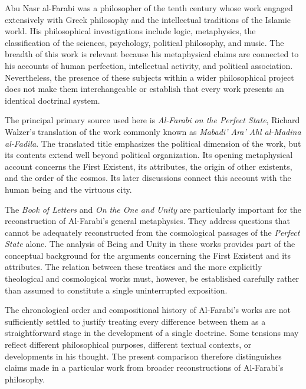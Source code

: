 Abu Nasr al-Farabi was a philosopher of the tenth
century whose work engaged extensively with Greek
philosophy and the intellectual traditions of the
Islamic world. His philosophical investigations
include logic, metaphysics, the classification of
the sciences, psychology, political philosophy,
and music. The breadth of this work is relevant
because his metaphysical claims are connected to
his accounts of human perfection, intellectual
activity, and political association. Nevertheless,
the presence of these subjects within a wider
philosophical project does not make them
interchangeable or establish that every work
presents an identical doctrinal system.

\label{para:VS.B01.P01.C08.S12.SS02.P002}

The principal primary source used here is
\textit{Al-Farabi on the Perfect State}, Richard
Walzer's translation of the work commonly known
as \textit{Mabadi' Ara' Ahl al-Madina al-Fadila}.
The translated title emphasizes the political
dimension of the work, but its contents extend
well beyond political organization. Its opening
metaphysical account concerns the First Existent,
its attributes, the origin of other existents,
and the order of the cosmos. Its later discussions
connect this account with the human being and
the virtuous city.
\citep[pp.~56--89, 229--233]{AlFarabiVirtuousCity}

\label{para:VS.B01.P01.C08.S12.SS02.P003}

The \textit{Book of Letters} and
\textit{On the One and Unity} are particularly
important for the reconstruction of Al-Farabi's
general metaphysics. They address questions
that cannot be adequately reconstructed from
the cosmological passages of the \textit{Perfect
State} alone. The analysis of Being and Unity
in these works provides part of the conceptual
background for the arguments concerning the
First Existent and its attributes. The relation
between these treatises and the more explicitly
theological and cosmological works must,
however, be established carefully rather than
assumed to constitute a single uninterrupted
exposition.
\citep[secs.~3.1--3.6]{MennAlFarabiMetaphysicsSEP2026}

\label{para:VS.B01.P01.C08.S12.SS02.P004}

The chronological order and compositional history
of Al-Farabi's works are not sufficiently settled
to justify treating every difference between
them as a straightforward stage in the development
of a single doctrine. Some tensions may reflect
different philosophical purposes, different
textual contexts, or developments in his thought.
The present comparison therefore distinguishes
claims made in a particular work from broader
reconstructions of Al-Farabi's philosophy.
\citep[secs.~1 and 4]{MennAlFarabiMetaphysicsSEP2026}

